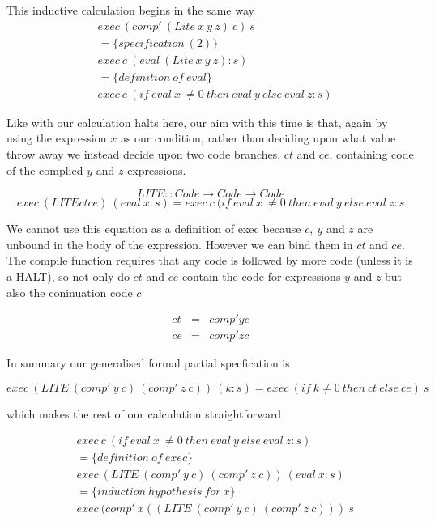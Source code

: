 \documentclass {article}
\begin{document}
This inductive calculation begins in the same way
\begin{align*}
	&exec \ (comp' \ (Lite \ x \ y \ z) \ c) \ s \\
	&= \{specification \ (2) \} \\
	&exec \ c \ (eval \ (Lite \ x \ y \ z) : s) \\
	&= \{definition \ of \ eval\} \\
	&exec \ c \ (if \ eval \ x \ \not= 0 \ then \ eval \ y \ else \ eval \ z : s)
\end{align*}

Like with \ite our calculation halts here,
our aim with this time is that, again by using
the expression $x$ as our condition,
rather than deciding upon what value throw away
we instead decide upon two code branches, $ct$ and $ce$,
containing code of the complied $y$ and $z$ expressions.

	\[ LITE :: Code \rightarrow Code \rightarrow Code \]
	\[ exec \ (LITE ct ce) \ (eval \ x:s) = exec \ c \ (if \ eval \ x \ \not= 0 \ then \ eval \ y \ else \ eval \ z : s  \]

We cannot use this equation as a definition of exec 
because $c, \ y$ and $z$ are unbound in the 
body of the expression\cite[page 10]{bandh}.
However we can bind them in $ct$ and $ce$.
The compile function \compp requires that any code is followed by
more code (unless it is a HALT),
so not only do  $ct$ and $ce$ contain the code for expressions
 $y$ and $z$ but also the coninuation code $c$

\begin{eqnarray*}
	ct &=& comp' y c \\
	ce &=& comp' z c
\end{eqnarray*}

In summary our generalised formal partial specfication is

	\[ exec \ (LITE \ (comp' \ y \ c) \ (comp' \ z \ c) ) \ (k:s) = exec \ (if \ k \not= 0 \ then \ ct \ else \ ce) \ s \]

which makes the rest of our calculation straightforward

\begin{align*}
	&exec \ c \ (if \ eval \ x \ \not= 0 \ then \ eval \ y \ else \ eval \ z : s) \\
	&= \{definition \ of \ exec \} \\
	&exec \ (LITE \ (comp' \ y \ c) \ (comp' \ z \ c) ) \ (eval \ x : s) \\
	&= \{induction \ hypothesis \ for \ x\} \\
	&exec \ (comp' \ x ((LITE \ (comp' \ y \ c) \ (comp' \ z \ c))) \ s
\end{align*}
\end{document}
